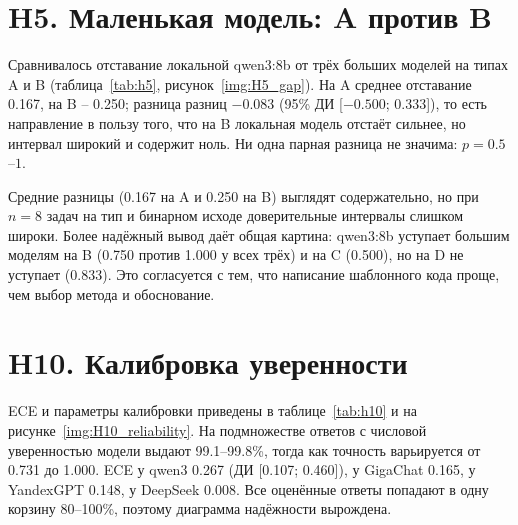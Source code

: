 \documentclass{bmstu}
\begin{document}
\section{H5. Маленькая модель: A против B}
Сравнивалось отставание локальной qwen3:8b от трёх больших моделей на типах A и B (таблица~\ref{tab:h5}, рисунок~\ref{img:H5_gap}). На A среднее отставание 0.167, на B -- 0.250; разница разниц $-0.083$ (95\% ДИ [$-0.500$; 0.333]), то есть направление в пользу того, что на B локальная модель отстаёт сильнее, но интервал широкий и содержит ноль. Ни одна парная разница не значима: $p=0.5$--$1$.

\begin{table}[htbp]
\centering
\caption{H5: отставание локальной модели на A и B}
\label{tab:h5}
\vspace{-10pt}
\end{table}


Средние разницы (0.167 на A и 0.250 на B) выглядят содержательно, но при $n=8$ задач на тип и бинарном исходе доверительные интервалы слишком широки. Более надёжный вывод даёт общая картина: qwen3:8b уступает большим моделям на B (0.750 против 1.000 у всех трёх) и на C (0.500), но на D не уступает (0.833). Это согласуется с тем, что написание шаблонного кода проще, чем выбор метода и обоснование.

\section{H10. Калибровка уверенности}
ECE и параметры калибровки приведены в таблице~\ref{tab:h10} и на рисунке~\ref{img:H10_reliability}. На подмножестве ответов с числовой уверенностью модели выдают 99.1--99.8\%, тогда как точность варьируется от 0.731 до 1.000. ECE у qwen3 0.267 (ДИ [0.107; 0.460]), у GigaChat 0.165, у YandexGPT 0.148, у DeepSeek 0.008. Все оценённые ответы попадают в одну корзину 80--100\%, поэтому диаграмма надёжности вырождена.
\end{document}
